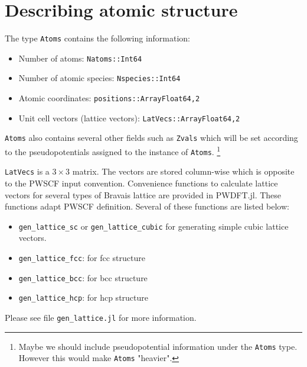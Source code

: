 \documentclass[a4paper,10pt]{article}
\newcommand{\jlinline}[1]{\texttt{#1}}
\newcommand{\txtinline}[1]{\texttt{#1}}
\begin{document}
\section{Describing atomic structure}
%
The type \jlinline{Atoms} contains the following information:
%
\begin{itemize}
\item Number of atoms: \jlinline{Natoms::Int64}
\item Number of atomic species: \jlinline{Nspecies::Int64}
\item Atomic coordinates: \jlinline{positions::Array{Float64,2}}
\item Unit cell vectors (lattice vectors): \jlinline{LatVecs::Array{Float64,2}}
\end{itemize}
%
\jlinline{Atoms} also contains several other fields such as \jlinline{Zvals}
which will be set according to the pseudopotentials assigned to
the instance of \jlinline{Atoms}.
\footnote{Maybe we should include pseudopotential information under the
\jlinline{Atoms} type. However this would make \jlinline{Atoms} "heavier".}


\jlinline{LatVecs} is a $3\times3$ matrix. The vectors are stored column-wise which is
opposite to the PWSCF input convention.
Convenience functions to calculate lattice vectors for several types of Bravais lattice
are provided in \textsf{PWDFT.jl}. These functions adapt PWSCF definition. Several
of these functions are listed below:
\begin{itemize}
\item \jlinline{gen_lattice_sc} or \jlinline{gen_lattice_cubic} for generating
simple cubic lattice vectors.
\item \jlinline{gen_lattice_fcc}: for fcc structure
\item \jlinline{gen_lattice_bcc}: for bcc structure
\item \jlinline{gen_lattice_hcp}: for hcp structure
\end{itemize}
Please see file \txtinline{gen_lattice.jl} for more information.
\end{document}
